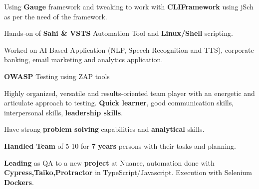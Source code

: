 \begin{cventries}
\begin{cvitemize}
 \item {Using \textbf{Gauge} framework and tweaking to work with \textbf{CLIFramework} using jSch as per the need of the framework.}

 \item {Hands-on of \textbf{Sahi \& VSTS} Automation Tool and \textbf{Linux/Shell} scripting.}

 \item {Worked on AI Based Application (NLP, Speech Recognition and TTS), corporate banking, email marketing and analytics application.}

 \item {\textbf{OWASP} Testing using ZAP tools}

 \item {Highly organized, versatile and results-oriented team player with an energetic and articulate approach to testing. \textbf{Quick learner}, good communication skills, interpersonal skills, \textbf{leadership skills}.}

 \item {Have strong \textbf{problem solving} capabilities and \textbf{analytical} skills.}

 \item {\textbf{Handled Team} of 5-10 for \textbf{7 years} persons with their tasks and planning.}
 
 \item {\textbf{Leading} as QA to a new \textbf{project} at Nuance, automation done with \textbf{Cypress,Taiko,Protractor} in TypeScript/Javascript. Execution with Selenium \textbf{Dockers}.}
\end{cvitemize}
\end{cventries}

